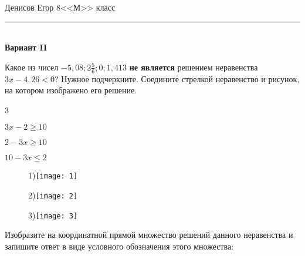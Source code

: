 \documentclass[a5paper,11pt]{article}
\begin{document}
	\begin{flushright}
		Денисов Егор 8<<М>> класс
		\noindent\rule{0.8\textwidth}{1pt}\\
		\textbf{Вариант II} \\
	\end{flushright}
\sloppy
\fussy
	\problem Какое из чисел $-5,08; 2\frac56; 0; 1,413$ \textbf{не является} решением неравенства $3x - 4,26 < 0$? Нужное подчеркните.
	\problem Соедините стрелкой неравенство и рисунок, на котором изображено его решение.
	\begin{enumerate}[label = \Roman*:]
	\end{enumerate}
	\begin{figure}[h]
		\begin{center}
			\begin{minipage}[h]{0.45\linewidth}
				1)\texttt{[image: 1]}
				\label{ris:experimoriginal} %
			\end{minipage}
			\begin{minipage}[h]{0.45\linewidth}
				2)\texttt{[image: 2]}
				\label{ris:experimcoded}
			\end{minipage}
			\begin{minipage}[h]{0.4\linewidth}
				3)\texttt{[image: 3]}
				\label{ris:experimcdfoded}
			\end{minipage}
		\end{center}
	\end{figure}
	\setlength{\columnsep}{10ex}
	\problem Изобразите на координатной прямой множество решений данного неравенства и запишите ответ в виде условного обозначения этого множества:
\end{document}
